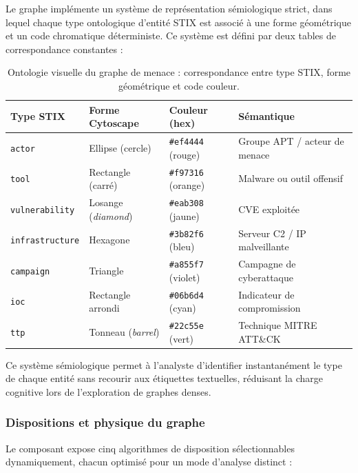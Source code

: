 Le graphe implémente un système de représentation sémiologique strict, dans lequel chaque type ontologique d'entité STIX est associé à une forme géométrique et un code chromatique déterministe. Ce système est défini par deux tables de correspondance constantes :

\begin{table}[H]
\centering
\caption{Ontologie visuelle du graphe de menace : correspondance entre type STIX, forme géométrique et code couleur.}
\label{tab:ontologie-graphe}
\begin{tabular}{|l|l|l|l|}
\hline
\textbf{Type STIX} & \textbf{Forme Cytoscape} & \textbf{Couleur (hex)} & \textbf{Sémantique} \\
\hline
\texttt{actor} & Ellipse (cercle) & \texttt{\#ef4444} (rouge) & Groupe APT / acteur de menace \\
\hline
\texttt{tool} & Rectangle (carré) & \texttt{\#f97316} (orange) & Malware ou outil offensif \\
\hline
\texttt{vulnerability} & Losange (\textit{diamond}) & \texttt{\#eab308} (jaune) & CVE exploitée \\
\hline
\texttt{infrastructure} & Hexagone & \texttt{\#3b82f6} (bleu) & Serveur C2 / IP malveillante \\
\hline
\texttt{campaign} & Triangle & \texttt{\#a855f7} (violet) & Campagne de cyberattaque \\
\hline
\texttt{ioc} & Rectangle arrondi & \texttt{\#06b6d4} (cyan) & Indicateur de compromission \\
\hline
\texttt{ttp} & Tonneau (\textit{barrel}) & \texttt{\#22c55e} (vert) & Technique MITRE ATT\&CK \\
\hline
\end{tabular}
\end{table}

Ce système sémiologique permet à l'analyste d'identifier instantanément le type de chaque entité sans recourir aux étiquettes textuelles, réduisant la charge cognitive lors de l'exploration de graphes denses.

\subsubsection{Dispositions et physique du graphe}

Le composant expose cinq algorithmes de disposition sélectionnables dynamiquement, chacun optimisé pour un mode d'analyse distinct :

